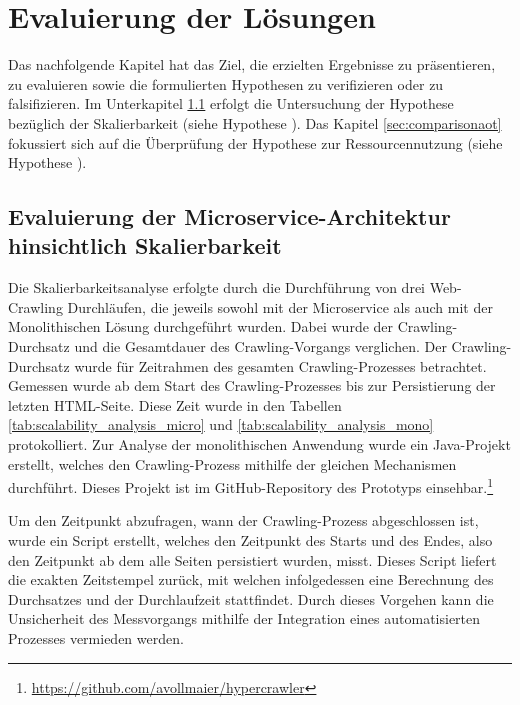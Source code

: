 \section{Evaluierung der Lösungen} \label{sec:comparison}
Das nachfolgende Kapitel hat das Ziel, die erzielten Ergebnisse zu präsentieren, zu evaluieren sowie die formulierten Hypothesen zu verifizieren oder zu falsifizieren. Im Unterkapitel \ref{sec:comparisonmicroservice} erfolgt die Untersuchung der Hypothese bezüglich der Skalierbarkeit (siehe Hypothese \textit{}). Das Kapitel \ref{sec:comparisonaot} fokussiert sich auf die Überprüfung der Hypothese zur Ressourcennutzung (siehe Hypothese \textit{}).
\subsection{Evaluierung der Microservice-Architektur hinsichtlich Skalierbarkeit}\label{sec:comparisonmicroservice}
Die Skalierbarkeitsanalyse erfolgte durch die Durchführung von drei Web-Crawling Durchläufen, die jeweils sowohl mit der Microservice als auch mit der Monolithischen Lösung durchgeführt wurden. Dabei wurde der Crawling-Durchsatz und die Gesamtdauer des Crawling-Vorgangs verglichen. Der Crawling-Durchsatz wurde für Zeitrahmen des gesamten Crawling-Prozesses betrachtet. Gemessen wurde ab dem Start des Crawling-Prozesses bis zur Persistierung der letzten HTML-Seite. Diese Zeit wurde in den Tabellen \ref{tab:scalability_analysis_micro} und \ref{tab:scalability_analysis_mono} protokolliert. \newline
Zur Analyse der monolithischen Anwendung wurde ein Java-Projekt erstellt, welches den Crawling-Prozess mithilfe der gleichen Mechanismen durchführt. Dieses Projekt ist im GitHub-Repository des Prototyps einsehbar.\footnote{\url{https://github.com/avollmaier/hypercrawler}}

Um den Zeitpunkt abzufragen, wann der Crawling-Prozess abgeschlossen ist, wurde ein Script erstellt, welches den Zeitpunkt des Starts und des Endes, also den Zeitpunkt ab dem alle Seiten persistiert wurden, misst. Dieses Script liefert die exakten Zeitstempel zurück, mit welchen infolgedessen eine Berechnung des Durchsatzes und der Durchlaufzeit stattfindet. Durch dieses Vorgehen kann die Unsicherheit des Messvorgangs mithilfe der Integration eines automatisierten Prozesses vermieden werden.\newline


